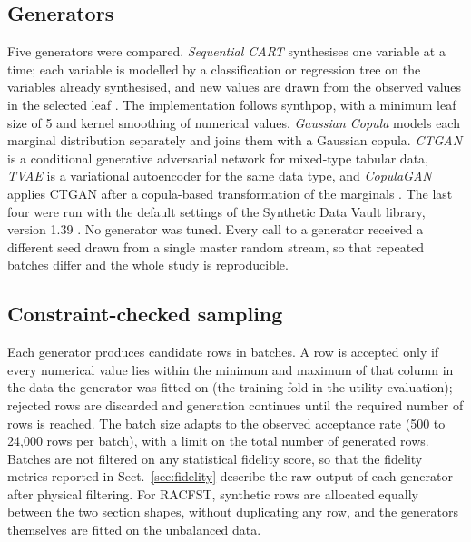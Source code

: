 \documentclass[pdflatex,sn-basic]{sn-jnl}
\begin{document}
\subsection{Generators}
Five generators were compared.
\emph{Sequential CART} synthesises one variable at a time; each variable is modelled by a classification or
regression tree on the variables already synthesised, and new values are drawn from the observed values in the
selected leaf \citep{reiter2005cart,nowok2016synthpop}. The implementation follows synthpop, with a minimum leaf
size of 5 and kernel smoothing of numerical values.
\emph{Gaussian Copula} models each marginal distribution separately and joins them with a Gaussian copula.
\emph{CTGAN} is a conditional generative adversarial network for mixed-type tabular data, \emph{TVAE} is a
variational autoencoder for the same data type, and \emph{CopulaGAN} applies CTGAN after a copula-based
transformation of the marginals \citep{xu2019ctgan}. The last four were run with the default settings of the
Synthetic Data Vault library, version 1.39 \citep{patki2016sdv}. No generator was tuned. Every call to a
generator received a different seed drawn from a single master random stream, so that repeated batches differ
and the whole study is reproducible.

\subsection{Constraint-checked sampling}
Each generator produces candidate rows in batches. A row is accepted only if every numerical value lies within
the minimum and maximum of that column in the data the generator was fitted on (the training fold in the utility
evaluation); rejected rows are discarded and generation continues until the required number of rows is reached.
The batch size adapts to the observed acceptance rate (500 to 24,000 rows per batch), with a limit on the total
number of generated rows. Batches are not filtered on any statistical fidelity score, so that the fidelity
metrics reported in Sect.~\ref{sec:fidelity} describe the raw output of each generator after physical filtering.
For RACFST, synthetic rows are allocated equally between the two section shapes, without duplicating any row,
and the generators themselves are fitted on the unbalanced data.
\end{document}
